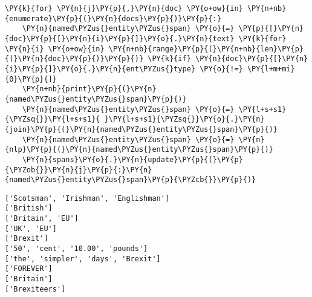     \begin{tcolorbox}[breakable, size=fbox, boxrule=1pt, pad at break*=1mm,colback=cellbackground, colframe=cellborder]
\begin{Verbatim}[commandchars=\\\{\}]
\PY{k}{for} \PY{n}{j}\PY{p}{,}\PY{n}{doc} \PY{o+ow}{in} \PY{n+nb}{enumerate}\PY{p}{(}\PY{n}{docs}\PY{p}{)}\PY{p}{:}
    \PY{n}{named\PYZus{}entity\PYZus{}span} \PY{o}{=} \PY{p}{[}\PY{n}{doc}\PY{p}{[}\PY{n}{i}\PY{p}{]}\PY{o}{.}\PY{n}{text} \PY{k}{for} \PY{n}{i} \PY{o+ow}{in} \PY{n+nb}{range}\PY{p}{(}\PY{n+nb}{len}\PY{p}{(}\PY{n}{doc}\PY{p}{)}\PY{p}{)} \PY{k}{if} \PY{n}{doc}\PY{p}{[}\PY{n}{i}\PY{p}{]}\PY{o}{.}\PY{n}{ent\PYZus{}type} \PY{o}{!=} \PY{l+m+mi}{0}\PY{p}{]}
    \PY{n+nb}{print}\PY{p}{(}\PY{n}{named\PYZus{}entity\PYZus{}span}\PY{p}{)}
    \PY{n}{named\PYZus{}entity\PYZus{}span} \PY{o}{=} \PY{l+s+s1}{\PYZsq{}}\PY{l+s+s1}{ }\PY{l+s+s1}{\PYZsq{}}\PY{o}{.}\PY{n}{join}\PY{p}{(}\PY{n}{named\PYZus{}entity\PYZus{}span}\PY{p}{)}
    \PY{n}{named\PYZus{}entity\PYZus{}span} \PY{o}{=} \PY{n}{nlp}\PY{p}{(}\PY{n}{named\PYZus{}entity\PYZus{}span}\PY{p}{)}
    \PY{n}{spans}\PY{o}{.}\PY{n}{update}\PY{p}{(}\PY{p}{\PYZob{}}\PY{n}{j}\PY{p}{:}\PY{n}{named\PYZus{}entity\PYZus{}span}\PY{p}{\PYZcb{}}\PY{p}{)}
\end{Verbatim}
\end{tcolorbox}

    \begin{Verbatim}[commandchars=\\\{\}]
['Scotsman', 'Irishman', 'Englishman']
['British']
['Britain', 'EU']
['UK', 'EU']
['Brexit']
['50', 'cent', '10.00', 'pounds']
['the', 'simpler', 'days', 'Brexit']
['FOREVER']
['Britain']
['Brexiteers']
    \end{Verbatim}

